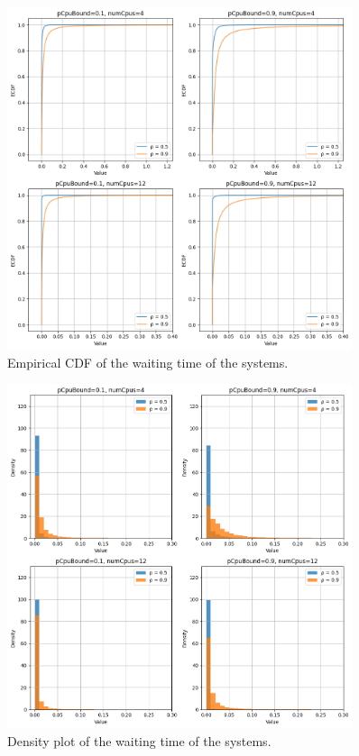 \begin{figure}[H]
    \captionsetup{type=figure}
    \centering
    \includegraphics[width=0.9\textwidth]{./images/04/sjf/wait/ecdf.png}
    \caption{Empirical CDF of the waiting time of the systems.}
    \label{fig:sjfWaitEcdf}
\end{figure}

\begin{figure}[H]
    \captionsetup{type=figure}
    \centering
    \includegraphics[width=0.9\textwidth]{./images/04/sjf/wait/density.png}
    \caption{Density plot of the waiting time of the systems.}
    \label{fig:sjfWaitDensity}
\end{figure}

